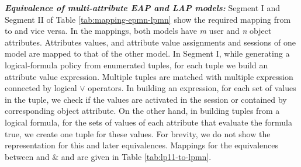 \textbf{\textit{Equivalence of multi-attribute EAP and LAP models:}} Segment I and Segment II of Table \ref{tab:mapping-epmn-lpmn} show the required mapping from \EPMNModel{} to  \LPMN{} and  vice versa. In the mappings, both models have \textit{m} user and \textit{n} object attributes. Attributes values, and attribute value assignments and sessions  of one model are mapped to that of the other model. In Segment I, while generating a logical-formula policy from enumerated tuples, for each tuple we build an attribute value expression. Multiple tuples are matched with multiple expression connected by logical $\lor$ operators. In building an expression, for each set of values  in the tuple, we check if the values are activated in the session or contained by corresponding object attribute. On the other hand, in building tuples from a logical formula, for the sets of values of each attribute that evaluate the formula true, we create one tuple for  these values. For brevity, we do not show the \TL{} representation for this and later equivalences. Mappings for  the equivalences between \LPOneOne{} and \LPMN{} \& \LPOneOne{} and \EPOneOneModels{}  are given in Table \ref{tab:lp11-to-lpmn}.





